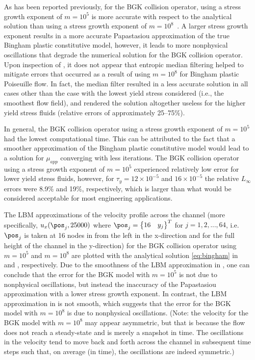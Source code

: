 As has been reported previously, for the BGK collision operator, using a stress growth exponent of $m = 10^5$ is more accurate with respect to the analytical solution than using a stress growth exponent of $m = 10^8$~\cite{chen2014simulations}.
A larger stress growth exponent results in a more accurate Papastasiou approximation of the true Bingham plastic constitutive model, however, it leads to more nonphysical oscillations that degrade the numerical solution for the BGK collision operator.
Upon inspection of , it does not appear that entropic median filtering helped to mitigate errors that occurred as a result of using $m = 10^8$ for Bingham plastic Poiseuille flow.
In fact, the median filter resulted in a less accurate solution in all cases other than the case with the lowest yield stress considered (i.e., the smoothest flow field), and rendered the solution altogether useless for the higher yield stress fluids (relative errors of approximately 25--75\%).

In general, the BGK collision operator using a stress growth exponent of $m = 10^5$ had the lowest computational time.
This can be attributed to the fact that a smoother approximation of the Bingham plastic constitutive model would lead to a solution for $\mu_{app}$ converging with less iterations.
The BGK collision operator using a stress growth exponent of $m = 10^5$ experienced relatively low error for lower yield stress fluids, however, for $\tau_y = 12 \times 10^{-5}$ and $16 \times 10^{-5}$ the relative $L_\infty$ errors were 8.9\% and 19\%, respectively, which is larger than what would be considered acceptable for most engineering applications.

The LBM approximations of the velocity profile across the channel (more specifically, $u_x(\pos_j, 25000)$ where $\pos_j = \begin{Bmatrix}16 & y_j\end{Bmatrix}^T$ for $j = 1, 2, ..., 64$, i.e. $\pos_j$ is taken at 16 nodes in from the left in the x-direction and for the full height of the channel in the y-direction) for the BGK collision operator using $m = 10^5$ and $m = 10^8$ are plotted with the analytical solution \eqref{eq:bingham} in  and , respectively.
Due to the smoothness of the LBM approximation in , one can conclude that the error for the BGK model with $m = 10^5$ is not due to nonphysical oscillations, but instead the inaccuracy of the Papastasiou approximation with a lower stress growth exponent.
In contrast, the LBM approximation in  is not smooth, which suggests that the error for the BGK model with $m = 10^8$ is due to nonphysical oscillations. (Note: the velocity for the BGK model with $m = 10^8$ may appear asymmetric, but that is because the flow does not reach a steady-state and  is merely a snapshot in time.
The oscillations in the velocity tend to move back and forth across the channel in subsequent time steps such that, on average (in time), the oscillations are indeed symmetric.)

